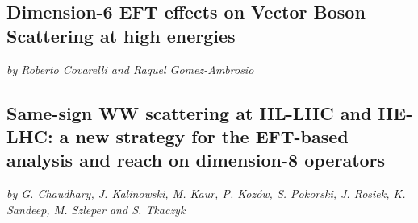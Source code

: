 \documentclass[../report.tex]{subfiles}
\providecommand{\main}{..}
\begin{document}
\subsection{Dimension-6 EFT effects on Vector Boson Scattering at high energies}\label{sec:VBFdim6eft}

\begin{center}
{\it by Roberto Covarelli and  Raquel Gomez-Ambrosio}
\end{center}



\newpage

\subsection{ Same-sign WW scattering at HL-LHC and HE-LHC: a new strategy for the EFT-based analysis and reach on dimension-8 operators}\label{sect-ssWW}
\begin{center}
 {\it by G. Chaudhary, 
 J. Kalinowski,
 M. Kaur, 
P. Koz{\'o}w, S. Pokorski,
J. Rosiek, 
K. Sandeep, 
M. Szleper 
and
S. Tkaczyk
}
\end{center}


\end{document}
